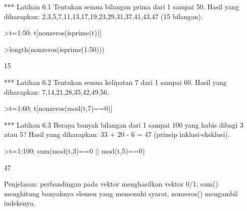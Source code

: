 \documentclass[a4paper,10pt]{article}
\begin{document}
\begin{eulernotebook}
\begin{eulercomment}
*** Latihan 6.1
Tentukan semua bilangan prima dari 1 sampai 50.
Hasil yang diharapkan: 2,3,5,7,11,13,17,19,23,29,31,37,41,43,47 (15 bilangan).
\end{eulercomment}
\begin{eulerprompt}
>t=1:50; t[nonzeros(isprime(t))]
\end{eulerprompt}
\begin{euleroutput}
  [2,  3,  5,  7,  11,  13,  17,  19,  23,  29,  31,  37,  41,  43,  47]
\end{euleroutput}
\begin{eulerprompt}
>length(nonzeros(isprime(1:50)))
\end{eulerprompt}
\begin{euleroutput}
  15
\end{euleroutput}
\begin{eulercomment}
*** Latihan 6.2
Tentukan semua kelipatan 7 dari 1 sampai 60.
Hasil yang diharapkan: 7,14,21,28,35,42,49,56.
\end{eulercomment}
\begin{eulerprompt}
>t=1:60; t[nonzeros(mod(t,7)==0)]
\end{eulerprompt}
\begin{euleroutput}
  [7,  14,  21,  28,  35,  42,  49,  56]
\end{euleroutput}
\begin{eulercomment}
*** Latihan 6.3
Berapa banyak bilangan dari 1 sampai 100 yang habis dibagi 3 atau 5?
Hasil yang diharapkan: 33 + 20 - 6 = 47 (prinsip inklusi-eksklusi).
\end{eulercomment}
\begin{eulerprompt}
>t=1:100; sum(mod(t,3)==0 || mod(t,5)==0)
\end{eulerprompt}
\begin{euleroutput}
  47
\end{euleroutput}
\begin{eulercomment}
Penjelasan: perbandingan pada vektor menghasilkan vektor 0/1; sum() menghitung
banyaknya elemen yang memenuhi syarat, nonzeros() mengambil indeksnya.


\end{eulercomment}
\end{eulernotebook}
\end{document}
